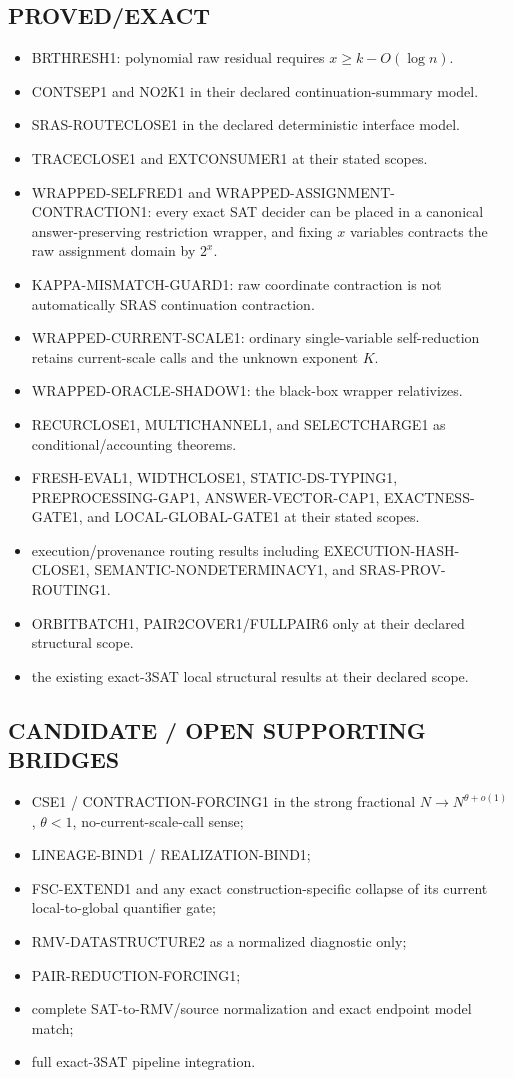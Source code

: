 \documentclass[11pt]{article}
\theoremstyle{plain}
\theoremstyle{definition}
\theoremstyle{remark}
\begin{document}
\subsection*{PROVED/EXACT}
\begin{itemize}
\item BRTHRESH1: polynomial raw residual requires \(x\ge k-O(\log n)\).
\item CONTSEP1 and NO2K1 in their declared continuation-summary model.
\item SRAS-ROUTECLOSE1 in the declared deterministic interface model.
\item TRACECLOSE1 and EXTCONSUMER1 at their stated scopes.
\item WRAPPED-SELFRED1 and WRAPPED-ASSIGNMENT-CONTRACTION1: every exact SAT
decider can be placed in a canonical answer-preserving restriction wrapper,
and fixing \(x\) variables contracts the raw assignment domain by \(2^x\).
\item KAPPA-MISMATCH-GUARD1: raw coordinate contraction is not automatically
SRAS continuation contraction.
\item WRAPPED-CURRENT-SCALE1: ordinary single-variable self-reduction retains
current-scale calls and the unknown exponent \(K\).
\item WRAPPED-ORACLE-SHADOW1: the black-box wrapper relativizes.
\item RECURCLOSE1, MULTICHANNEL1, and SELECTCHARGE1 as conditional/accounting
theorems.
\item FRESH-EVAL1, WIDTHCLOSE1, STATIC-DS-TYPING1,
PREPROCESSING-GAP1, ANSWER-VECTOR-CAP1, EXACTNESS-GATE1, and
LOCAL-GLOBAL-GATE1 at their stated scopes.
\item execution/provenance routing results including EXECUTION-HASH-CLOSE1,
SEMANTIC-NONDETERMINACY1, and SRAS-PROV-ROUTING1.
\item ORBITBATCH1, PAIR2COVER1/FULLPAIR6 only at their declared structural
scope.
\item the existing exact-3SAT local structural results at their declared
scope.
\end{itemize}

\subsection*{CANDIDATE / OPEN SUPPORTING BRIDGES}
\begin{itemize}
\item CSE1 / CONTRACTION-FORCING1 in the strong fractional
\(N\to N^{\theta+o(1)}\), \(\theta<1\), no-current-scale-call sense;
\item LINEAGE-BIND1 / REALIZATION-BIND1;
\item FSC-EXTEND1 and any exact construction-specific collapse of its current
local-to-global quantifier gate;
\item RMV-DATASTRUCTURE2 as a normalized diagnostic only;
\item PAIR-REDUCTION-FORCING1;
\item complete SAT-to-RMV/source normalization and exact endpoint model match;
\item full exact-3SAT pipeline integration.
\end{itemize}
\end{document}
